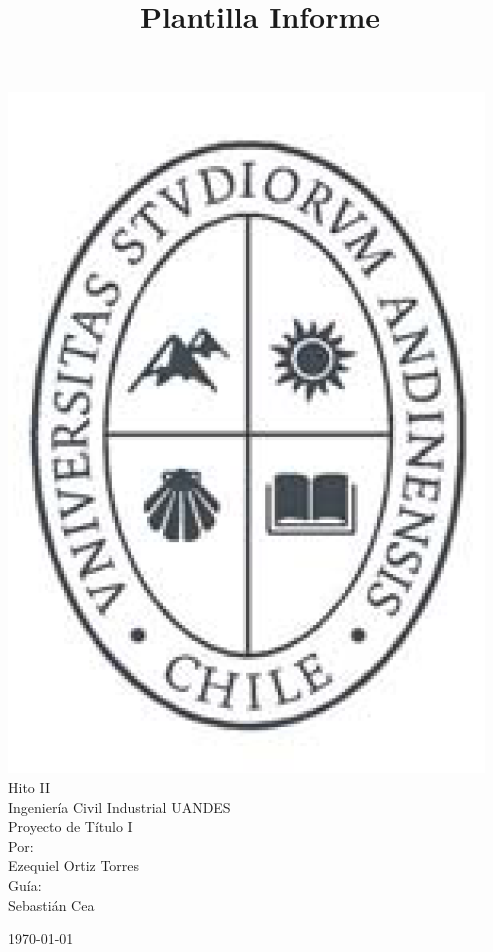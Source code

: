 \documentclass[11pt,letterpaper]{article}
\title{Plantilla Informe}
\begin{document}

\begin{titlepage}

\begin{center}
\includegraphics[scale=0.3]{Log.png}\\
\vspace{1.0cm} {\LARGE Hito II\\ Ingenier\'ia Civil Industrial UANDES\\  Proyecto de T\'itulo I} \\

\vspace{1.5cm} \LARGE{Por:\\ Ezequiel Ortiz Torres \\ Gu\'ia: \\ Sebasti\'an Cea}

\vspace{2.3cm}

\vspace{.5cm} \today

\end{center}
\end{titlepage}
\end{document}
